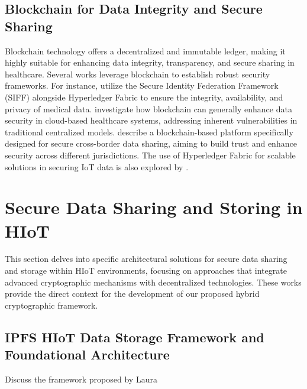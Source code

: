 \documentclass[cic,tc,english]{iiufrgs}
\numberwithin{algorithm}{chapter}
\begin{document}
        \subsection{Blockchain for Data Integrity and Secure Sharing}
            Blockchain technology offers a decentralized and immutable ledger, making it highly suitable for enhancing data integrity, transparency, and secure sharing in healthcare. Several works leverage blockchain to establish robust security frameworks. For instance, \citet{Tian2019} utilize the Secure Identity Federation Framework (SIFF) alongside Hyperledger Fabric to ensure the integrity, availability, and privacy of medical data. \citet{Esposito2018} investigate how blockchain can generally enhance data security in cloud-based healthcare systems, addressing inherent vulnerabilities in traditional centralized models. \citet{Rahman2020} describe a blockchain-based platform specifically designed for secure cross-border data sharing, aiming to build trust and enhance security across different jurisdictions. The use of Hyperledger Fabric for scalable solutions in securing IoT data is also explored by \citet{Eghmazi2024}.
    

    \section{Secure Data Sharing and Storing in HIoT}
        \label{sec:securedata}
        This section delves into specific architectural solutions for secure data sharing and storage within HIoT environments, focusing on approaches that integrate advanced cryptographic mechanisms with decentralized technologies. These works provide the direct context for the development of our proposed hybrid cryptographic framework.

        \subsection{IPFS HIoT Data Storage Framework and Foundational Architecture}
            \begin{draft}{Discuss the framework proposed by Laura}
            \end{draft}
\end{document}
